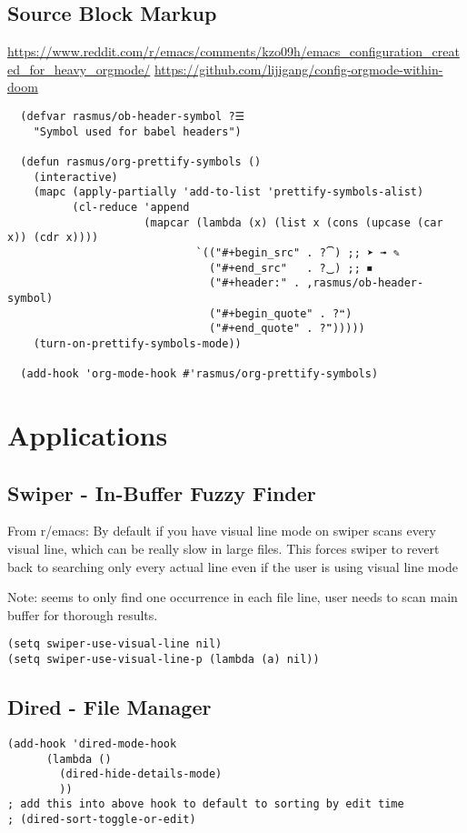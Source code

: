 \documentclass[8pt]{article}
\begin{document}
\subsection{Source Block Markup}
\label{sec:org091a858}
\url{https://www.reddit.com/r/emacs/comments/kzo09h/emacs\_configuration\_created\_for\_heavy\_orgmode/}
\url{https://github.com/lijigang/config-orgmode-within-doom}
\begin{verbatim}
  (defvar rasmus/ob-header-symbol ?☰
    "Symbol used for babel headers")

  (defun rasmus/org-prettify-symbols ()
    (interactive)
    (mapc (apply-partially 'add-to-list 'prettify-symbols-alist)
          (cl-reduce 'append
                     (mapcar (lambda (x) (list x (cons (upcase (car x)) (cdr x))))
                             `(("#+begin_src" . ?⏠) ;; ➤ ➟ ✎
                               ("#+end_src"   . ?⏡) ;; ⏹
                               ("#+header:" . ,rasmus/ob-header-symbol)
                               ("#+begin_quote" . ?❝)
                               ("#+end_quote" . ?❞)))))
    (turn-on-prettify-symbols-mode))

  (add-hook 'org-mode-hook #'rasmus/org-prettify-symbols)
\end{verbatim}
\section{Applications}
\label{sec:org6a01b31}
\subsection{Swiper - In-Buffer Fuzzy Finder}
\label{sec:org6f8abad}
From r/emacs:
By default if you have visual line mode on swiper scans every visual line, which can be really slow in large files. This forces swiper to revert back to searching only every actual line even if the user is using visual line mode

Note: seems to only find one occurrence in each file line, user needs to scan main buffer for thorough results.
\begin{verbatim}
(setq swiper-use-visual-line nil)
(setq swiper-use-visual-line-p (lambda (a) nil))
\end{verbatim}
\subsection{Dired - File Manager}
\label{sec:org3055a95}
\begin{verbatim}
(add-hook 'dired-mode-hook
      (lambda ()
        (dired-hide-details-mode)
        ))
; add this into above hook to default to sorting by edit time
; (dired-sort-toggle-or-edit)
\end{verbatim}
\end{document}
